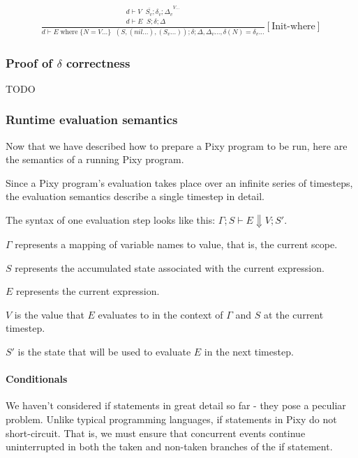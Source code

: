 \documentclass{scrartcl}
\DeclareMathOperator{\where}{where}
\DeclareMathOperator{\initrel}{\overset{init}{\Rightarrow}}
\begin{document}
    \begin{align*}
    \frac{
        \begin{matrix}
        \overline{d \vdash V \initrel S_v; \delta_v; \Delta_v}^{V...} \\
        d \vdash E \initrel S; \delta; \Delta
        \end{matrix}
    }{
        d \vdash E \where \{ N=V... \} \initrel (S, (nil...), (S_v...)); \delta; \Delta, \Delta_v..., \delta(N)=\delta_v...
    }[\text{Init-where}]
    \end{align*}
    
    \subsubsection{Proof of $\delta$ correctness}
    
    TODO
    
    \subsubsection{Runtime evaluation semantics}
    
    Now that we have described how to prepare a Pixy program to be run, here are the semantics of a running Pixy program.
    
    Since a Pixy program's evaluation takes place over an infinite series of timesteps, the evaluation semantics describe a single timestep in detail.
    
    The syntax of one evaluation step looks like this: $\Gamma; S \vdash E \Downarrow V; S'$.
    
    $\Gamma$ represents a mapping of variable names to value, that is, the current scope.
    
    $S$ represents the accumulated state associated with the current expression.
    
    $E$ represents the current expression.
    
    $V$ is the value that $E$ evaluates to in the context of $\Gamma$ and $S$ at the current timestep.
    
    $S'$ is the state that will be used to evaluate $E$ in the next timestep.
    
    \paragraph{Conditionals}
    
    We haven't considered if statements in great detail so far - they pose a peculiar problem. Unlike typical programming languages, if statements in Pixy do not short-circuit. That is, we must ensure that concurrent events continue uninterrupted in both the taken and non-taken branches of the if statement.
    
\end{document}
